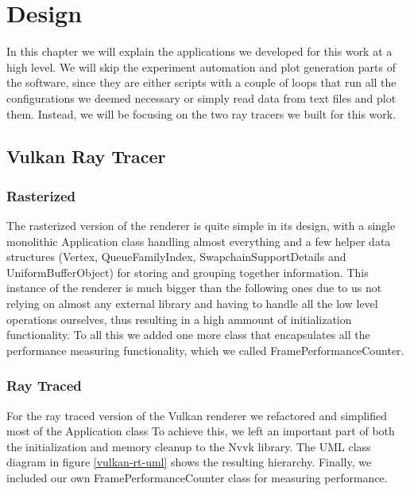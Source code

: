 \chapter{Design}
In this chapter we will explain the applications we developed for this work at a high level. We will skip the experiment automation and plot generation parts of the software, since they are either scripts with a couple of loops that run all the configurations we deemed necessary or simply read data from text files and plot them. Instead, we will be focusing on the two ray tracers we built for this work.

\section{Vulkan Ray Tracer}
\subsection{Rasterized}
The rasterized version of the renderer is quite simple in its design, with a single monolithic Application class handling almost everything and a few helper data structures (Vertex, QueueFamilyIndex, SwapchainSupportDetails and UniformBufferObject) for storing and grouping together information. This instance of the renderer is much bigger than the following ones due to us not relying on almost any external library and having to handle all the low level operations ourselves, thus resulting in a high ammount of initialization functionality. To all this we added one more class that encapsulates all the performance measuring functionality, which we called FramePerformanceCounter.

\subsection{Ray Traced}
For the ray traced version of the Vulkan renderer we refactored and simplified most of the Application class To achieve this, we left an important part of both the initialization and memory cleanup to the Nvvk library. The UML class diagram in figure \ref{vulkan-rt-uml} shows the resulting hierarchy. Finally, we included our own FramePerformanceCounter class for measuring performance.

